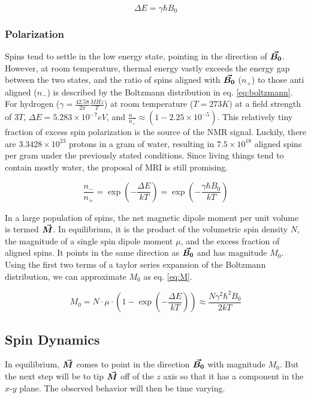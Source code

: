 \begin{equation}\label{eq:delta_E}
    \Delta E = \gamma \hbar B_0
\end{equation}

\subsubsection{Polarization}
Spins tend to settle in the low energy state, pointing in the direction of $\bm{\vec{B_0}}$. However, at room temperature,
thermal energy vastly exceeds the energy gap between the two states, and the ratio of spins aligned with $\bm{\vec{B_0}}$
($n_+$) to those anti aligned ($n_-$) is described by the Boltzmann distribution in eq. \ref{eq:boltzmann}. For hydrogen
($\gamma = \frac{42.58}{2\pi} \frac{MHz}{T}$) at room temperature ($T=273 K$) at a field strength of $3T$, $\Delta E =
5.283 \times 10^{-7} eV$, and $\frac{n_-}{n_+} \approx (1 - 2.25 \times 10^{-5})$. This relatively tiny fraction of
excess spin polarization is the source of the NMR signal. Luckily, there are $3.3428 \times 10^{23}$ protons in a gram
of water, resulting in $7.5 \times 10^{18}$ aligned spins per gram under the previously stated conditions. Since living
things tend to contain mostly water, the proposal of MRI is still promising.

\begin{equation}\label{eq:boltzmann}
    \frac{n_-}{n_+} = \exp(-\frac{\Delta E}{k T}) = \exp(-\frac{\gamma \hbar B_0}{k T})
\end{equation}

In a large population of spins, the net magnetic dipole moment per unit volume is termed $\bm{\vec{M}}$. In equilibrium, it
is the product of the volumetric spin density $N$, the magnitude of a single spin dipole moment $\mu$, and the excess
fraction of aligned spins. It points in the same direction as $\bm{\vec{B_0}}$ and has magnitude $M_0$. Using the first two
terms of a taylor series expansion of the Boltzmann distribution, we can approximate $M_0$ as eq. \ref{eq:M}.

\begin{equation}\label{eq:M}
    M_0 = N \cdot \mu \cdot (1-\exp(-\frac{\Delta E}{k T})) \approx \frac{N \gamma^2 \hbar^2 B_0}{2 k T}
\end{equation}

\subsection{Spin Dynamics}
In equilibrium, $\bm{\vec{M}}$ comes to point in the direction $\bm{\vec{B_0}}$ with magnitude $M_0$. But the next step will be
to tip $\bm{\vec{M}}$ off of the $z$ axis so that it has a component in the $x$-$y$ plane. The observed behavior will then
be time varying.

